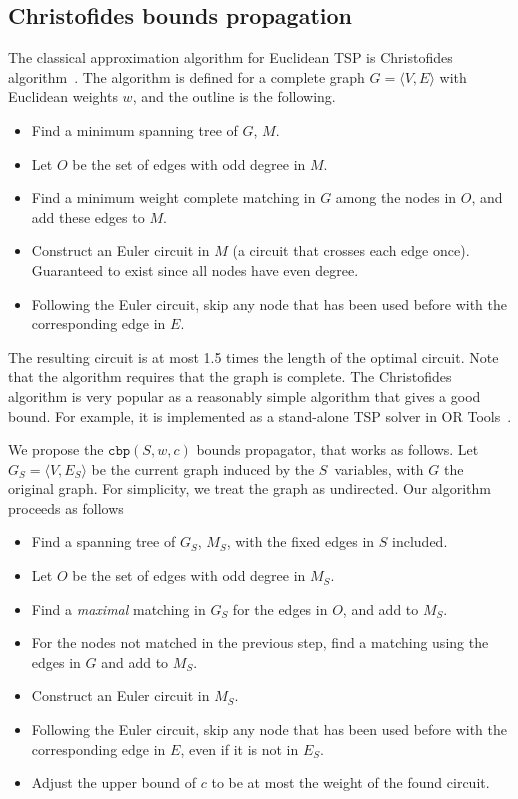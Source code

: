 \documentclass[runningheads]{llncs}
\newcommand{\cons}[1]{\texttt{#1}}
\begin{document}
\subsection{Christofides bounds propagation}
\label{sec:christofides}

The classical approximation algorithm for Euclidean TSP is
Christofides algorithm~\cite{christofides}.  The algorithm is defined
for a complete graph $G=\langle V, E \rangle$ with Euclidean weights
$w$, and the outline is the following. 

\begin{itemize}
\item Find a minimum spanning tree of $G$, $M$.
\item Let $O$ be the set of edges with odd degree in $M$.
\item Find a minimum weight complete matching in $G$ among the nodes in $O$,
  and add these edges to $M$.
\item Construct an Euler circuit in $M$ (a circuit that crosses each
  edge once). Guaranteed to exist since all nodes have even degree.
\item Following the Euler circuit, skip any node that has been used
  before with the corresponding edge in $E$.
\end{itemize}

The resulting circuit is at most 1.5 times the length of the optimal
circuit. Note that the algorithm requires that the graph is complete.
The Christofides algorithm is very popular as a reasonably simple
algorithm that gives a good bound. For example, it is implemented as a
stand-alone TSP solver in OR Tools~\cite{ortools}.

We propose the $\cons{cbp}(S,w,c)$ bounds propagator, that works as
follows. Let $G_S=\langle V, E_S \rangle$ be the current graph induced
by the $S$ variables, with $G$ the original graph. For simplicity, we
treat the graph as undirected. Our algorithm proceeds as follows
\begin{itemize}
\item Find a spanning tree of $G_S$, $M_S$, with the fixed edges in
  $S$ included.
\item Let $O$ be the set of edges with odd degree in $M_S$.
\item Find a \emph{maximal} matching in $G_S$ for the
  edges in $O$, and add to $M_S$.
\item For the nodes not matched in the previous step, find a matching
  using the edges in $G$ and add to $M_S$.
\item Construct an Euler circuit in $M_S$.
\item Following the Euler circuit, skip any node that has been used
  before with the corresponding edge in $E$, even if it is not in
  $E_S$.
\item Adjust the upper bound of $c$ to be at most the weight of the
  found circuit.
\end{itemize}
\end{document}
